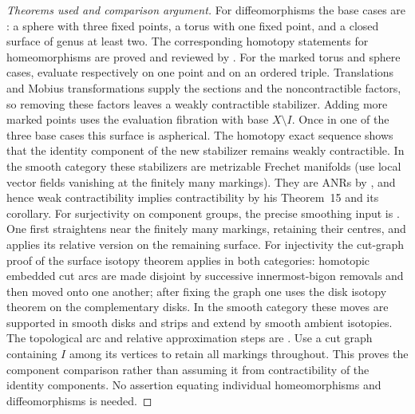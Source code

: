 \begin{proof}[Theorems used and comparison argument]
For diffeomorphisms the base cases are
\citet[Theorem~1(a)--(c)]{EarleEells1967}: a sphere with three fixed
points, a torus with one fixed point, and a closed surface of genus
at least two.  The corresponding homotopy statements for
homeomorphisms are proved and reviewed by
\citet[Theorems~1.5.1--1.5.2 and \S1.7]{Hamstrom1974}.
For the marked torus and sphere cases, evaluate respectively on one
point and on an ordered triple.  Translations and Mobius transformations
supply the sections and the noncontractible factors, so removing
these factors leaves a weakly contractible stabilizer.  Adding more
marked points uses the evaluation fibration with base $X\setminus I$.
Once in one of the three base cases this surface is aspherical.
The homotopy exact sequence shows that the identity component of
the new stabilizer remains weakly contractible.  In the smooth category
these stabilizers are metrizable Frechet manifolds (use local vector
fields vanishing at the finitely many markings).  They are ANRs by
\citet[Theorem~5]{Palais1966}, and hence weak contractibility implies
contractibility by his Theorem~15 and its corollary.
For surjectivity on component groups, the precise smoothing input is
\citet[Theorem~B and the Handle Smoothing Theorem]{Hatcher2022Torus}.
One first straightens near the finitely many markings, retaining
their centres, and applies its relative version on the remaining
surface.  For injectivity the cut-graph proof of the surface isotopy
theorem applies in both categories: homotopic embedded cut arcs are
made disjoint by successive innermost-bigon removals and then moved
onto one another; after fixing the graph one uses the disk isotopy
theorem on the complementary disks.  In the smooth category these
moves are supported in smooth disks and strips and extend by smooth
ambient isotopies.  The topological arc and relative approximation
steps are \citet[Theorem~3.1 and Appendix, Theorems~A1--A4]{Epstein1966}.
Use a cut graph containing $I$ among its vertices to retain all
markings throughout.  This proves the component comparison rather
than assuming it from contractibility of the identity components.
No assertion equating individual homeomorphisms and diffeomorphisms
is needed.


\end{proof}
